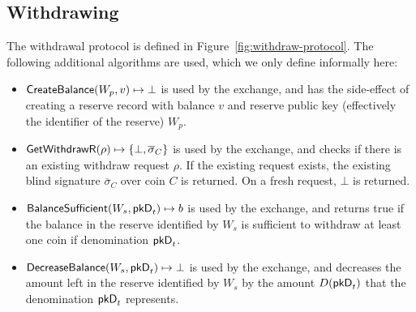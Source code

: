 \subsection{Withdrawing}
The withdrawal protocol is defined in Figure~\ref{fig:withdraw-protocol}.
The following additional algorithms are used, which we only define informally here:
\begin{itemize}
  \item $\mathsf{CreateBalance}(W_p, v) \mapsto \bot$ is used by the exchange,
    and has the side-effect of creating a reserve record with balance $v$
    and reserve public key (effectively the identifier of the reserve) $W_p$.
  \item $\mathsf{GetWithdrawR}(\rho) \mapsto \{\bot,\overline{\sigma}_C\}$
    is used by the exchange, and checks
    if there is an existing withdraw request $\rho$.  If the existing request
    exists, the existing blind signature $\overline{\sigma}_C$ over
    coin $C$ is returned.  On a fresh request, $\bot$ is
    returned.
  \item $\mathsf{BalanceSufficient}(W_s,\mathsf{pkD}_t) \mapsto b$ is used by the exchange, and
    returns true if the balance in the reserve identified by $W_s$ is sufficient to
    withdraw at least one coin if denomination $\mathsf{pkD}_t$.
  \item $\mathsf{DecreaseBalance}(W_s,\mathsf{pkD}_t) \mapsto \bot$ is used by the exchange, and
    decreases the amount left in the reserve identified by $W_s$ by the amount $D(\mathsf{pkD}_t)$
    that the denomination $\mathsf{pkD}_t$ represents.
\end{itemize}

